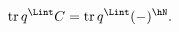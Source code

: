 \begin{equation}
%
\mbox{tr} \, q^{\Lint} C
        = \mbox{tr} \, q^{\Lint} (-)^{\hN}.
\label{eq:step3}
%
\end{equation}

